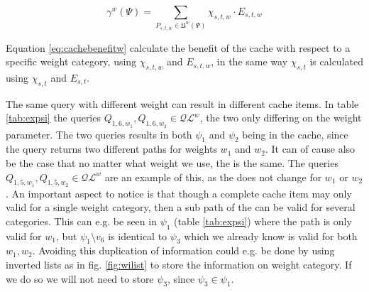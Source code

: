 \begin{equation} \label{eq:cachebenefitw}
\gamma^w(\Psi) = \sum\limits_{P_{s,t,w} \in \mathfrak{U}^w(\Psi)} \chi_{s,t,w} \cdot E_{s,t,w}
\end{equation}

Equation \ref{eq:cachebenefitw} calculate the benefit of the cache with respect to a specific weight category, using $\chi_{s,t,w}$ and $E_{s,t,w}$, in the same way $\chi_{s,t}$ is calculated using $\chi_{s,t}$ and $E_{s,t}$.





The same query with different weight can result in different cache items. In table \ref{tab:expsi} the queries $Q_{1,6,w_1},Q_{1,6,w_2} \in \mathcal{QL}^{w}$, the two only differing on the weight parameter. The two queries results in both $\psi_1$ and $\psi_2$ being in the cache, since the query returns two different paths for weights $w_1$ and $w_2$. 
It can of cause also be the case that no matter what weight we use, the \spath is the same. The queries $Q_{1,5,w_1},Q_{1,5,w_2} \in \mathcal{QL}^{w}$ are an example of this, as the \spath does not change for $w_1$ or $w_2$. 
An important aspect to notice is that though a complete cache item may only valid for a single weight category, then a sub path of the \spath can be valid for several categories. This can e.g. be seen in $\psi_1$ (table \ref{tab:expsi}) where the path is only valid for $w_1$, but $\psi_1 \setminus v_6$ is identical to $\psi_3$ which we already know is valid for both $w_1,w_2$. Avoiding this duplication of information could e.g. be done by using inverted lists as in fig. \ref{fig:wilist} to store the information on weight category. If we do so we will not need to store $\psi_3$, since $\psi_3 \in \psi_1$.





% 
% 


